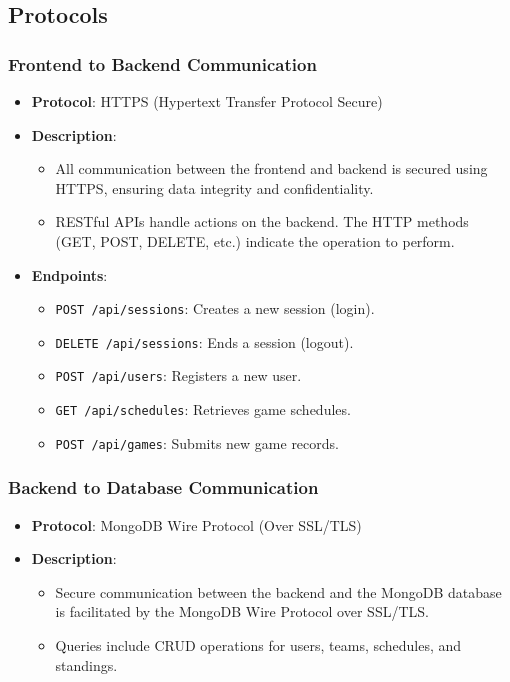 \documentclass[12pt, titlepage]{article}
\begin{document}
\subsection*{Protocols}

\subsubsection*{Frontend to Backend Communication}
\begin{itemize}
  \item \textbf{Protocol}: HTTPS (Hypertext Transfer Protocol Secure)
  \item \textbf{Description}:
  \begin{itemize}
      \item All communication between the frontend and backend is secured using HTTPS, ensuring data integrity and confidentiality.
      \item RESTful APIs handle actions on the backend. The HTTP methods (GET, POST, DELETE, etc.) indicate the operation to perform.
  \end{itemize}
  \item \textbf{Endpoints}:
  \begin{itemize}
      \item \texttt{POST /api/sessions}: Creates a new session (login).
      \item \texttt{DELETE /api/sessions}: Ends a session (logout).
      \item \texttt{POST /api/users}: Registers a new user.
      \item \texttt{GET /api/schedules}: Retrieves game schedules.
      \item \texttt{POST /api/games}: Submits new game records.
  \end{itemize}
\end{itemize}

\subsubsection*{Backend to Database Communication}
\begin{itemize}
  \item \textbf{Protocol}: MongoDB Wire Protocol (Over SSL/TLS)
  \item \textbf{Description}:
        \begin{itemize}
          \item Secure communication between the backend and the MongoDB database is facilitated by the MongoDB Wire Protocol over SSL/TLS.
          \item Queries include CRUD operations for users, teams, schedules, and standings.
        \end{itemize}
\end{itemize}
\end{document}
